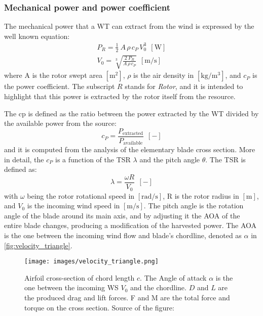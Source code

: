 \subsubsection{Mechanical power and power coefficient}\label{subsec:mech_pow_and_pow_coeff}
The mechanical power that a \acrshort{WT} can extract from the wind is expressed by the well known equation:
\begin{gather}
    P_R = \frac{1}{2}\ A \, \rho \, c_P \, V_0^3 \ \ \left[\si{\watt}\right] \label{eq:power} \\
    V_0 = \sqrt[3]{\frac{2 \ P_R}{A \, \rho \, c_P}} \ \ \left[\si{\meter \per \second}\right] 
\end{gather}
where A is the rotor swept area $\left[\si{\square \meter}\right]$, $\rho$ is the air density in $\left[\si{\kilo\gram\per\cubic\meter}\right]$, and $c_P$ is the power coefficient. The subscript $R$ stands for \textit{Rotor}, and it is intended to highlight that this power is extracted by the rotor itself from the resource.  

The \acrfull{cp} is defined as the ratio between the power extracted by the \acrshort{WT} divided by the available power from the source:
\begin{equation}
    c_P = \frac{P_{\text{extracted}}}{P_{\text{available}}} \ \ \left[-\right]
    \label{eq:c_P}
\end{equation}
and it is computed from the analysis of the elementary blade cross section. More in detail, the $c_P$ is a function of the \acrfull{TSR} $\lambda$ and the pitch angle $\theta$. The \acrshort{TSR} is defined as:
\begin{equation}
    \lambda = \frac{\omega R}{V_0} \ \ \left[-\right]
    \label{eq:TSR}
\end{equation}
with $\omega$ being the rotor rotational speed in $\left[\si{\radian \per \second}\right]$, R is the rotor radius in $\left[\si{\meter}\right]$, and $V_0$ is the incoming wind speed in  $\left[\si{\meter \per \second}\right]$. The pitch angle is the rotation angle of the blade around its main axis, and by adjusting it the \acrfull{AOA} of the entire blade changes, producing a modification of the harvested power. The \acrshort{AOA} is the one between the incoming wind flow and blade's chordline, denoted as $\alpha$ in \autoref{fig:velocity_triangle}. 
\begin{figure}[htb]
    \centering
    \texttt{[image: images/velocity\_triangle.png]}
    \caption{Airfoil cross-section of chord length $c$. The Angle of attack $\alpha$ is the one between the incoming \acrshort{WS} $V_0$ and the chordline. $D$ and $L$ are the produced drag and lift forces. F and M are the total force and torque on the cross section. Source of the figure: \cite{Aerodynamics_of_wind_turbines}}
    \label{fig:velocity_triangle}
\end{figure}

